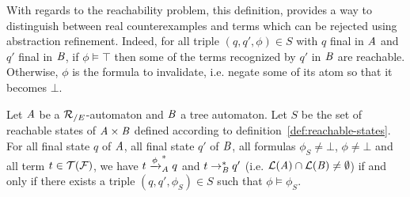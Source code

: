 With regards to the reachability problem, this definition, provides a
way to distinguish between real counterexamples and terms which can be rejected
using abstraction refinement. 
Indeed, for all triple $(q,q',\phi)\in S$ with $q$ final in $\mathit A$ and $q'$ final
in $\mathit B$, if $\phi \models \top$
then some of the terms recognized by $q'$ in $\mathit B$ are reachable. 
Otherwise, $\phi$ is the formula to invalidate, i.e. negate some of
its atom so that it becomes $\bot$.

\begin{lemma}
  Let $\mathit A$ be a ${\mathcal R_{/E}}$-automaton and $\mathit B$ a tree automaton. Let $S$ be the set of
  reachable states of $\mathit A\times \mathit B$ defined according to
  definition~\ref{def:reachable-states}. For all final state $q$ of $\mathit A$, all
  final state $q'$ of $\mathit B$, all formulas $\phi_S\neq\bot$, $\phi\neq \bot$ and
  all term $t\in\mathcal{T(F)}$, we have $t\xrightarrow{\phi}^*_\mathit A q$ and $t \rightarrow_\mathit B^* q'$
  (i.e. $\mathcal{L}(\mathit A)\cap \mathcal{L}(\mathit B) \neq \emptyset$) if and only if there exists a
  triple $(q,q',\phi_S)\in S$ such that $\phi \models \phi_S$. 
\end{lemma}

